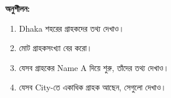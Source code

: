 \textbf{অনুশীলন:}\begin{enumerate}
\item Dhaka শহরের গ্রাহকদের তথ্য দেখাও।
\item মোট গ্রাহকসংখ্যা বের করো।
\item যেসব গ্রাহকের Name A দিয়ে শুরু, তাঁদের তথ্য দেখাও।
\item যেসব City-তে একাধিক গ্রাহক আছেন, সেগুলো দেখাও।
\end{enumerate}
